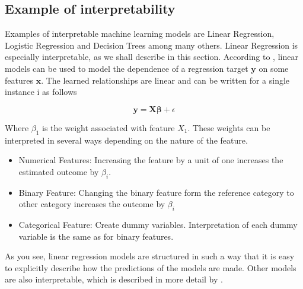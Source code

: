 \subsection{Example of interpretability}

Examples of interpretable machine learning models are Linear Regression, Logistic Regression and Decision Trees among many others. Linear Regression is especially interpretable, as we shall describe in this section. According to \citet{Molnar:2020:Book}, linear models can be used to model the dependence of a regression target $\boldsymbol{y}$ on some features $\boldsymbol{x}$. The learned relationships are linear and can be written for a single instance i as follows

\begin{equation*}
    \boldsymbol{y} = \boldsymbol{X} \boldsymbol{\beta} + \epsilon
\end{equation*}

Where $\beta_1$ is the weight associated with feature $X_1$. These weights can be interpreted in several ways depending on the nature of the feature.

\begin{itemize}
    \item Numerical Features: Increasing the feature by a unit of one increases the estimated outcome by $\beta_i$.
    \item Binary Feature: Changing the binary feature form the reference category to other category increases the outcome by $\beta_i$
    \item Categorical Feature: Create dummy variables. Interpretation of each dummy variable is the same as for binary features.
\end{itemize}

As you see, linear regression models are structured in such a way that it is easy to explicitly describe how the predictions of the models are made. Other models are also interpretable, which is described in more detail by \citet{Molnar:2020:Book}.